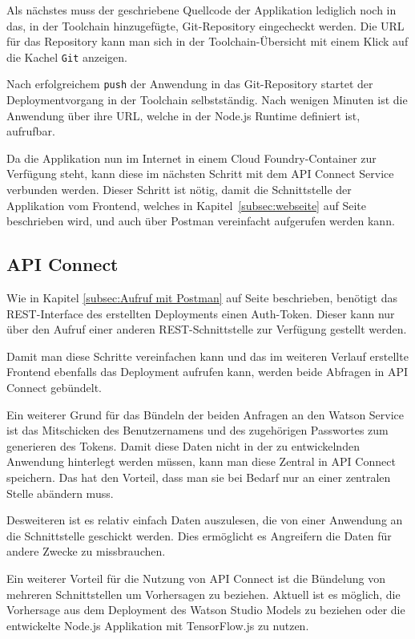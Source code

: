 Als nächstes muss der geschriebene Quellcode der Applikation lediglich noch in das, in der Toolchain hinzugefügte,
Git-Repository eingecheckt werden. Die URL für das Repository kann man sich in der Toolchain-Übersicht mit einem Klick
auf die Kachel \texttt{Git} anzeigen.

Nach erfolgreichem \texttt{push} der Anwendung in das Git-Repository startet der Deploymentvorgang in der Toolchain
selbstständig. Nach wenigen Minuten ist die Anwendung über ihre URL, welche in der Node.js Runtime definiert ist,
aufrufbar.

Da die Applikation nun im Internet in einem Cloud Foundry-Container zur Verfügung steht, kann diese im nächsten Schritt
mit dem API Connect Service verbunden werden. Dieser Schritt ist nötig, damit die Schnittstelle der Applikation vom
Frontend, welches in Kapitel~\ref{subsec:webseite} auf Seite~\pageref{subsec:webseite} beschrieben wird, und auch über
Postman vereinfacht aufgerufen werden kann.

\subsection{API Connect}
\label{subsec:apiconnect}
Wie in Kapitel \ref{subsec:Aufruf mit Postman} auf Seite \pageref{subsec:Aufruf mit Postman} beschrieben, benötigt das
REST-Interface des erstellten Deployments einen Auth-Token. Dieser kann nur über den Aufruf einer anderen
REST-Schnittstelle zur Verfügung gestellt werden.

Damit man diese Schritte vereinfachen kann und das im weiteren Verlauf erstellte Frontend ebenfalls das Deployment aufrufen
kann, werden beide Abfragen in API Connect gebündelt.

Ein weiterer Grund für das Bündeln der beiden Anfragen an den Watson Service ist das Mitschicken des Benutzernamens und
des zugehörigen Passwortes zum generieren des Tokens. Damit diese Daten nicht in der zu entwickelnden Anwendung hinterlegt
werden müssen, kann man diese Zentral in API Connect speichern. Das hat den Vorteil, dass man sie bei Bedarf nur an einer
zentralen Stelle abändern muss.

Desweiteren ist es relativ einfach Daten auszulesen, die von einer Anwendung an die Schnittstelle geschickt werden. Dies
ermöglicht es Angreifern die Daten für andere Zwecke zu missbrauchen.

Ein weiterer Vorteil für die Nutzung von API Connect ist die Bündelung von mehreren Schnittstellen um Vorhersagen zu
beziehen. Aktuell ist es möglich, die Vorhersage aus dem Deployment des Watson Studio Models zu beziehen oder die
entwickelte Node.js Applikation mit TensorFlow.js zu nutzen.

